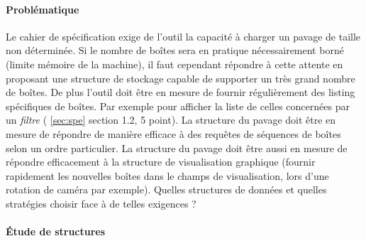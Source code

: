 \paragraph{Problématique}
Le cahier de spécification exige de l'outil la capacité à charger un pavage de taille non déterminée. Si le nombre de boîtes sera en pratique nécessairement borné (limite mémoire de la machine), il faut cependant répondre à cette attente en proposant une structure de stockage capable de supporter un très grand nombre de boîtes. De plus l'outil doit être en mesure de fournir régulièrement des listing spécifiques de boîtes. Par exemple pour afficher la liste de celles concernées par un \emph{filtre} (\cf{} \ref{sec:spe} section 1.2, 5 point). La structure du pavage doit être en mesure de répondre de manière efficace à des requêtes de séquences de boîtes selon un ordre particulier. La structure du pavage doit être aussi en mesure de répondre efficacement à la structure  de visualisation graphique (fournir rapidement les nouvelles boîtes dans le champs de visualisation, lors d'une rotation de caméra par exemple). Quelles structures de données et quelles stratégies choisir face à de telles exigences ?  %



\paragraph{Étude de structures}

